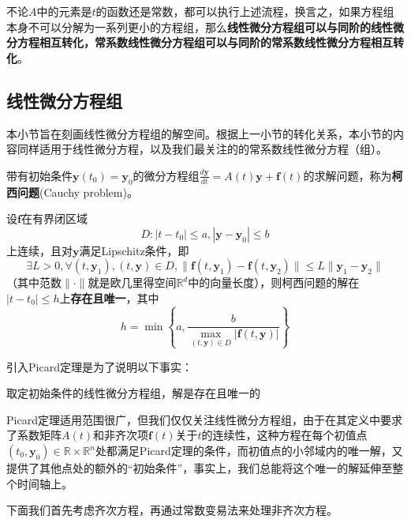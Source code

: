 不论$A$中的元素是$t$的函数还是常数，都可以执行上述流程，换言之，如果方程组本身不可以分解为一系列更小的方程组，那么\textbf{线性微分方程组可以与同阶的线性微分方程相互转化，常系数线性微分方程组可以与同阶的常系数线性微分方程相互转化}。

\subsection{线性微分方程组}\label{sub:solution_of_linear_equation_system}

本小节旨在刻画线性微分方程组的解空间。根据上一小节的转化关系，本小节的内容同样适用于线性微分方程，以及我们最关注的的常系数线性微分方程（组）。

\begin{definition}[柯西问题]
    带有初始条件$\mathbf{y}(t_0)=\mathbf{y}_0$的微分方程组$\frac{d\mathbf{y}}{dt}=A(t)\mathbf{y}+\mathbf{f}(t)$的求解问题，称为\textbf{柯西问题}(Cauchy problem)。
\end{definition}

\begin{claim}[Picard定理]
    设$\mathbf{f}$在有界闭区域
    $$D:|t-t_0|\leq a,|\mathbf{y}-\mathbf{y}_0|\leq b$$
    上连续，且对$\mathbf{y}$满足Lipschitz条件，即
    $$\exists L>0,\forall (t,\mathbf{y}_1),(t,\mathbf{y})\in D,\|\mathbf{f}(t,\mathbf{y}_1)-\mathbf{f}(t,\mathbf{y}_2)\|\leq L\|\mathbf{y}_1-\mathbf{y}_2\|$$
    （其中范数$\|\cdot\|$就是欧几里得空间$\mathbb{R}^d$中的向量长度），则柯西问题的解在$|t-t_0|\leq h$上\textbf{存在且唯一}，其中
    $$h=\min\left\{a,\frac{b}{\max_{(t,\mathbf{y})\in D}|\mathbf{f}(t,\mathbf{y})|}\right\}$$
\end{claim}

引入Picard定理是为了说明以下事实：
\begin{proposition}
    取定初始条件的线性微分方程组，解是存在且唯一的
\end{proposition}

Picard定理适用范围很广，但我们仅仅关注线性微分方程组，由于在其定义中要求了系数矩阵$A(t)$和非齐次项$\mathbf{f}(t)$关于$t$的连续性，这种方程在每个初值点$(t_0,\mathbf{y}_0)\in\mathbb{R} \times \mathbb{R}^n$处都满足Picard定理的条件，而初值点的小邻域内的唯一解，又提供了其他点处的额外的“初始条件”，事实上，我们总能将这个唯一的解延伸至整个时间轴上。

下面我们首先考虑齐次方程，再通过常数变易法来处理非齐次方程。

